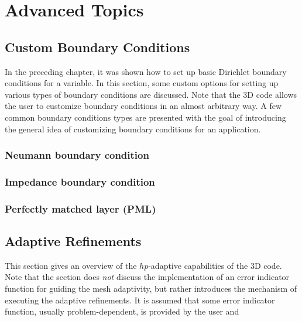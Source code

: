 %
%

\chapter{Advanced Topics}
\label{chap:advanced}


\section{Custom Boundary Conditions}
\label{sec:advanced-BC}

In the preceding chapter, it was shown how to set up basic Dirichlet boundary conditions for a variable. In this section, some custom options for setting up various types of boundary conditions are discussed. Note that the \hp3D code allows the user to customize boundary conditions in an almost arbitrary way. A few common boundary conditions types are presented with the goal of introducing the general idea of customizing boundary conditions for an application.

\subsection{Neumann boundary condition}
\label{sec:impedance}
\subsection{Impedance boundary condition}
\label{sec:impedance}
\subsection{Perfectly matched layer (PML)}
\label{sec:pml}

\section{Adaptive Refinements}
\label{sec:adaptivity}

This section gives an overview of the $hp$-adaptive capabilities of the \hp3D code. Note that the section does \emph{not} discuss the implementation of an error indicator function for guiding the mesh adaptivity, but rather introduces the mechanism of executing the adaptive refinements. It is assumed that some error indicator function, usually problem-dependent, is provided by the user and 

